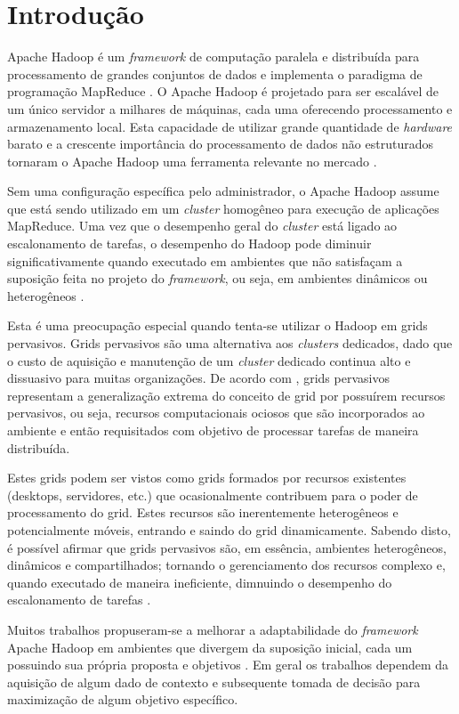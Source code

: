 \chapter{Introdução}
\label{chap:Intro}
Apache Hadoop é um \textit{framework} de computação paralela e distribuída para processamento de grandes conjuntos de dados e implementa o paradigma de programação \mbox{MapReduce} \cite{Dean2008}. O Apache Hadoop é projetado para ser escalável de um único servidor a milhares de máquinas, cada uma oferecendo processamento e armazenamento local. Esta capacidade de utilizar grande quantidade de \textit{hardware} barato e a crescente importância do processamento de dados não estruturados tornaram o Apache Hadoop uma ferramenta relevante no mercado \cite{Su}.

Sem uma configuração específica pelo administrador, o Apache Hadoop assume que está sendo utilizado em um \textit{cluster} homogêneo para execução de aplicações \mbox{MapReduce}. Uma vez que o desempenho geral do \textit{cluster} está ligado ao escalonamento de tarefas, o desempenho do Hadoop pode diminuir significativamente quando executado em ambientes que não satisfaçam a suposição feita no projeto do \textit{framework}, ou seja, em ambientes dinâmicos ou heterogêneos \cite{Kumar2012}.

Esta é uma preocupação especial quando tenta-se utilizar o Hadoop em grids pervasivos. Grids pervasivos são uma alternativa aos \textit{clusters} dedicados, dado que o custo de aquisição e manutenção de um \textit{cluster} dedicado continua alto e dissuasivo para muitas organizações. De acordo com \cite{Parashar2010}, grids pervasivos representam a generalização  extrema do conceito de grid por possuírem recursos pervasivos, ou seja, recursos computacionais ociosos que são incorporados ao ambiente e então requisitados com objetivo de processar tarefas de maneira distribuída. 

Estes grids podem ser vistos como grids formados por recursos existentes (desktops, servidores, etc.) que ocasionalmente contribuem para o poder de processamento do grid. Estes recursos são inerentemente heterogêneos e potencialmente móveis, entrando e saindo do grid dinamicamente. Sabendo disto, é possível afirmar que grids pervasivos são, em essência, ambientes heterogêneos, dinâmicos e compartilhados; tornando o gerenciamento dos recursos complexo e, quando executado de maneira ineficiente, dimnuindo  o desempenho do escalonamento de tarefas \cite{Nascimento}.

Muitos trabalhos propuseram-se a melhorar a adaptabilidade do \textit{framework} Apache Hadoop em ambientes que divergem da suposição inicial, cada um possuindo sua própria proposta e objetivos \cite{Kumar2012} \cite{Zaharia2008} \cite{Rasooli2012} \cite{Sandholm2010} \cite{3PGCIC}. Em geral os trabalhos dependem da aquisição de algum dado de contexto e subsequente tomada de decisão para maximização de algum objetivo específico.


